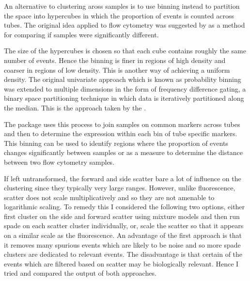 An alternative to clustering aross samples is to use binning instead to partition the space into hypercubes in which the proportion
of events is counted across tubes.
The original idea applied to flow cytometry was suggested by \citet{Roederer:2001tz} as a method for comparing if samples were significantly different.

The size of the hypercubes is chosen so that each cube contains roughly the same number of events.
Hence the binning is finer in regions of high density and coarser in regions of low density.
This is another way of achieving a uniform density.
The original univariate approach which is known as probability binning was extended to multiple dimensions in the form of frequency difference gating,
a binary space partitioning technique in which data is iteratively partitioned along the median.
This is the approach taken by the .  \citep{Rogers:2008ij,Rogers:2009ff} 




The  package uses this process to join samples on common markers across tubes and then to determine the expression within each bin of tube specific markers.
This binning can be used to identify regions where the proportion of events changes significantly between samples
or as a measure to determine the distance between two flow cytometry samples.

If left untransformed, the forward and side scatter bare a lot of influence on the clustering since they typically very large ranges.
However, unlike fluorescence, scatter does not scale multiplicatively and so they are not amenable to logarithmic scaling.
To remedy this I considered the following two options, either first cluster on the side and forward scatter using mixture models
and then run spade on each scatter cluster individually,
or, scale the scatter so that it appears on a similar scale as the fluorescence.
An advantage of the first approach is that it removes many spurious events which are likely to be noise and so more spade clusters are
dedicated to relevant events.
The disadvantage is that certain of the events which are filtered based on scatter may be biologically relevant.
Hence I tried and compared the output of both approaches.


